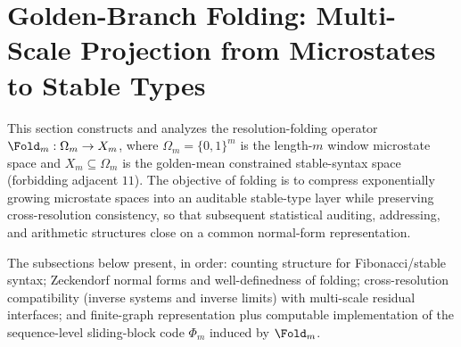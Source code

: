 \section{Golden-Branch Folding: Multi-Scale Projection from Microstates to Stable Types}\label{sec:folding}

This section constructs and analyzes the resolution-folding operator \(\Fold_m:\Omega_m\to X_m\), where \(\Omega_m=\{0,1\}^m\) is the length-\(m\) window microstate space and \(X_m\subseteq\Omega_m\) is the golden-mean constrained stable-syntax space (forbidding adjacent \(11\)). The objective of folding is to compress exponentially growing microstate spaces into an auditable stable-type layer while preserving cross-resolution consistency, so that subsequent statistical auditing, addressing, and arithmetic structures close on a common normal-form representation.\par
The subsections below present, in order: counting structure for Fibonacci/stable syntax; Zeckendorf normal forms and well-definedness of folding; cross-resolution compatibility (inverse systems and inverse limits) with multi-scale residual interfaces; and finite-graph representation plus computable implementation of the sequence-level sliding-block code \(\Phi_m\) induced by \(\Fold_m\).


















